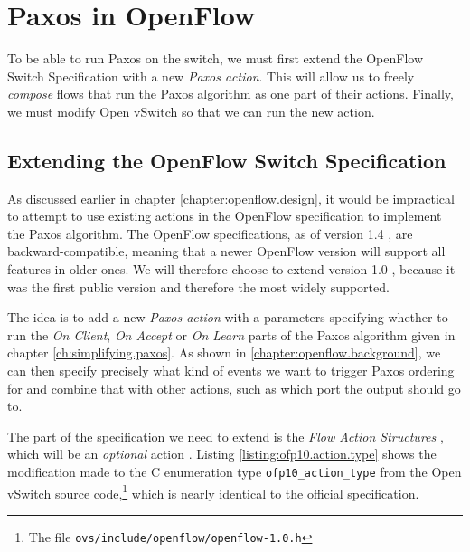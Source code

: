 \section{Paxos in OpenFlow}

To be able to run Paxos on the switch, we must first extend the OpenFlow
Switch Specification with a new \textit{Paxos action}.
%
%
%
This will allow us to freely \textit{compose} flows that run the
Paxos algorithm as one part of their actions.
%
Finally, we must modify Open vSwitch so that we can run the new action.

\subsection{Extending the OpenFlow Switch Specification}

As discussed earlier in chapter \ref{chapter:openflow.design}, it would be
impractical to attempt to use existing actions in the OpenFlow specification
to implement the Paxos algorithm.
%
The OpenFlow specifications, as of version 1.4 \cite{openflow-1.4}, are
backward-compatible, meaning that a newer OpenFlow version will support all
features in older ones.  We will therefore choose to extend version 1.0
\cite{openflow-1.0}, because it was the first public version and therefore
the most widely supported.

The idea is to add a new \textit{Paxos action} with a parameters 
specifying whether to run the \textit{On Client}, \textit{On Accept} or 
\textit{On Learn} parts of the Paxos algorithm given in chapter
\vref{ch:simplifying.paxos}.
%
As shown in \vref{chapter:openflow.background}, we can then specify
precisely what kind of events we want to trigger Paxos ordering for and
combine that with other actions, such as which port the output should go to.

The part of the specification we need to extend is the 
\textit{Flow Action Structures} \cite[pp.~21--22]{openflow-1.0},
which will be an \textit{optional} action \cite[pp.~3--6]{openflow-1.0}.
Listing \ref{listing:ofp10.action.type} shows the modification made to
the C enumeration type \texttt{ofp10\_{}action\_{}type} from the Open
vSwitch source code,\footnote{The file
  \texttt{ovs/include/openflow/openflow-1.0.h}} which is nearly identical
to the official specification.

